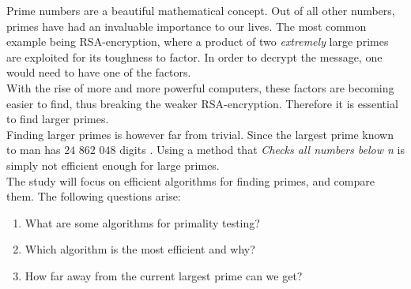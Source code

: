 \documentclass[main.tex]{subfiles}
\begin{document}
Prime numbers are a beautiful mathematical concept. Out of all other numbers,
primes have had an invaluable importance to our lives. The most common example
being RSA-encryption, where a product of two \emph{extremely} large primes are
exploited for its toughness to factor. In order to decrypt the message, one
would need to have one of the factors. \\

With the rise of more and more powerful computers, these factors are becoming
easier to find, thus breaking the weaker RSA-encryption. Therefore it
is essential to find larger primes. \\

Finding larger primes is however far from trivial. Since the largest prime known
to man has $24$ $862$ $048$ digits \cite{prime:largest_digits}. Using a method
that \emph{Checks all numbers below n} is simply not efficient enough for large
primes. \\

The study will focus on efficient algorithms for finding primes, and compare
them. The following questions arise:

\begin{enumerate}
\item What are some algorithms for primality testing?
\item Which algorithm is the most efficient and why?
\item How far away from the current largest prime can we get?
\end{enumerate}
\end{document}

